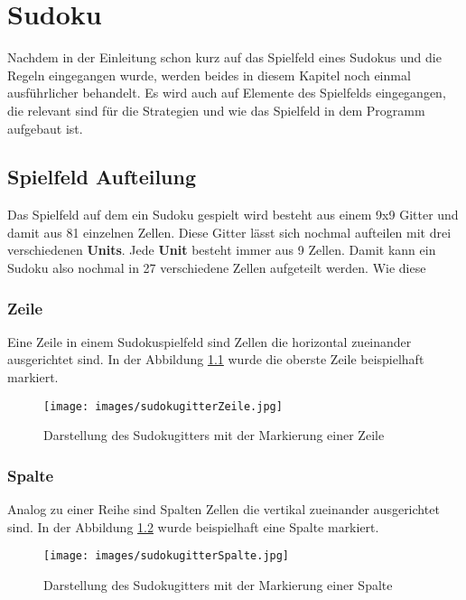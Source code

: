 

\chapter{Sudoku}
Nachdem in der Einleitung schon kurz auf das Spielfeld eines Sudokus und die Regeln eingegangen wurde, werden beides in diesem Kapitel noch einmal ausführlicher behandelt. Es wird auch auf Elemente des Spielfelds eingegangen, die relevant sind für die Strategien und wie das Spielfeld in dem Programm aufgebaut ist. 


\section{Spielfeld Aufteilung}
Das Spielfeld auf dem ein Sudoku gespielt wird besteht aus einem 9x9 Gitter und damit aus 81 einzelnen Zellen. Diese Gitter lässt sich nochmal aufteilen mit drei verschiedenen \textbf{Units}. Jede \textbf{Unit} besteht immer aus 9 Zellen. Damit kann ein Sudoku also nochmal in 27 verschiedene Zellen aufgeteilt werden. Wie diese  

\subsection{Zeile}
Eine Zeile in einem Sudokuspielfeld sind Zellen die horizontal zueinander ausgerichtet sind. In der Abbildung \ref{fig:SudokugitterZeile} wurde die oberste Zeile beispielhaft markiert.
\begin{figure}[htbp]
	\centering
	\texttt{[image: images/sudokugitterZeile.jpg]}
	\caption{Darstellung des Sudokugitters mit der Markierung einer Zeile}
	\label{fig:SudokugitterZeile}
\end{figure}

\subsection{Spalte}
Analog zu einer Reihe sind Spalten Zellen die vertikal zueinander ausgerichtet sind. In der Abbildung \ref{fig:SudokugitterSpalte} wurde beispielhaft eine Spalte markiert.
\begin{figure}[htbp]
	\centering
	\texttt{[image: images/sudokugitterSpalte.jpg]}
	\caption{Darstellung des Sudokugitters mit der Markierung einer Spalte}
	\label{fig:SudokugitterSpalte}
\end{figure}

